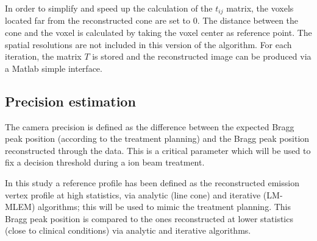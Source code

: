 In order to simplify and speed up the calculation of the $t_{ij}$ matrix, the voxels located far from the reconstructed cone are set to 0. The distance between the cone and the voxel is calculated by taking the voxel center as reference point. The spatial resolutions are not included in this version of the algorithm.\newline
For each iteration, the matrix $T$ is stored and the reconstructed image can be produced via a Matlab simple interface.

\subsection{Precision estimation}
\label{MatMeth:precision}

The camera precision is defined as the difference between the expected Bragg peak position (according to the treatment planning) and the Bragg peak position reconstructed through the data. This is a critical parameter which will be used to fix a decision threshold during a ion beam treatment.
 
In this study a reference profile has been defined as the reconstructed emission vertex profile at high statistics, via analytic (line cone) and iterative (LM-MLEM) algorithms; this will be used to mimic the treatment planning. This Bragg peak position is compared to the ones reconstructed at lower statistics (close to clinical conditions) via analytic and iterative algorithms.

